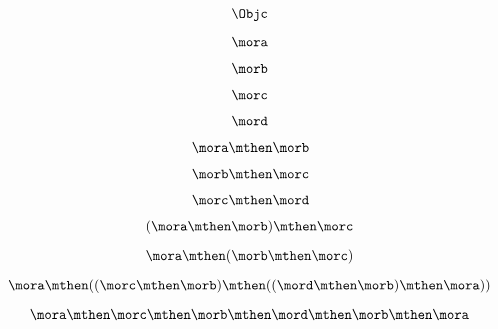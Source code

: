 {\begin{forslides}
		\begin{equation}
			\label{eq:03}
			\Objc
		\end{equation}

		\begin{equation}
			\label{eq:04}
			\mora
		\end{equation}

		\begin{equation}
			\label{eq:05}
			\morb
		\end{equation}

		\begin{equation}
			\label{eq:06}
			\morc
		\end{equation}

		\begin{equation}
			\label{eq:07}
			\mord
		\end{equation}

		\begin{equation}
			\label{eq:08}
			\mora \mthen \morb
		\end{equation}

		\begin{equation}
			\label{eq:09}
			\morb \mthen \morc
		\end{equation}

		\begin{equation}
			\label{eq:10}
			\morc \mthen \mord
		\end{equation}

		\begin{equation}
			\label{eq:11}
			(\mora \mthen \morb) \mthen \morc
		\end{equation}

		\begin{equation}
			\label{eq:12}
			\mora \mthen  (\morb \mthen \morc )
		\end{equation}

		\begin{equation}
			\label{eq:13}
			\mora \mthen  ((\morc \mthen \morb ) \mthen (( \mord \mthen \morb ) \mthen \mora ))
		\end{equation}

		\begin{equation}
			\label{eq:14}
			\mora \mthen  \morc \mthen \morb  \mthen \mord \mthen \morb  \mthen \mora
		\end{equation}


\end{forslides}}
